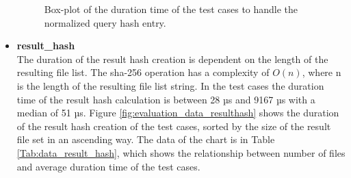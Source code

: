 \documentclass[draft,final]{vutinfth} %
\begin{document}
\begin{itemize}
	\begin{figure}[!h]
		\centering
		\caption{Box-plot of the duration time of the test cases to handle the normalized query hash entry.}
		\label{fig:evaluation_perf_norm_hash}
	\end{figure}
	\item \textbf{result\_hash} \\
	The duration of the result hash creation is dependent on the length of the resulting file list. The sha-256 operation has a complexity of $O(n)$, where n is the length of the resulting file list string. In the test cases the duration time of the result hash calculation is between 28 µs and 9167 µs with a median of 51 µs. Figure \ref{fig:evaluation_data_resulthash} shows the duration of the result hash creation of the test cases, sorted by the size of the result file set in an ascending way. The data of the chart is in Table \ref{Tab:data_result_hash}, which shows the relationship between number of files and average duration time of the test cases.  
	

\end{itemize}
\end{document}
